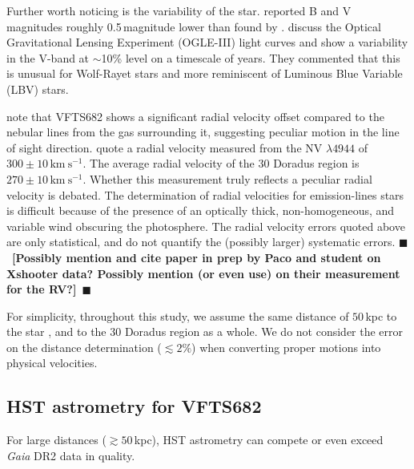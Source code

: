 \documentclass[apjl,twocolumn]{emulateapj}
\newcommand{\todo}[1]{{\large $\blacksquare$~\textbf{\color{red}[#1]}}~$\blacksquare$}
\newcommand{\kms}{{\,\mathrm{km\ s^{-1}}}}
\begin{document}
Further worth noticing is the variability of the
star. \citet{parker:93} reported B and V magnitudes roughly 0.5\,magnitude
lower than found by \citet{evans:11}.
\citet{bestenlehner:11} discuss the Optical Gravitational Lensing
Experiment (OGLE-III) light curves \citep{udalski:08} and show a
variability in the V-band at $\sim$10\% level on a timescale of years.
They commented that this is unusual for Wolf-Rayet stars and more reminiscent
of Luminous Blue Variable (LBV) stars. %

\cite{bressert:12} note that VFTS682 shows a significant radial
velocity offset compared to the nebular lines from the gas surrounding
it, suggesting peculiar motion in the line of sight direction.
\citet{bestenlehner:11} quote a radial velocity measured from the
N{\footnotesize V} $\lambda4944$ of   $300\pm10\kms$. The average radial velocity of the 30 Doradus region is 
$270\pm10\kms$. Whether this measurement truly reflects a peculiar radial velocity is debated. The determination of radial velocities for emission-lines stars is difficult because of the presence of an optically thick, non-homogeneous, and variable wind obscuring the photosphere. The radial velocity errors quoted above are only statistical, and do not quantify the (possibly larger)
systematic errors.  \todo{Possibly mention and cite paper in prep by Paco and student on Xshooter data?  Possibly mention (or even use) on their measurement for the RV?}


For simplicity, throughout this study, we assume the same
distance of $50$\,kpc to the star \citep[][]{pietrzynski:13}, and to
the 30 Doradus region as a whole. We do not consider the error on
the distance determination ($\lesssim2\%$) when converting proper motions into
physical velocities.

\subsection{HST astrometry for VFTS682}


For large distances ($\gtrsim50$\,kpc), HST astrometry can compete or even exceed \emph{Gaia} DR2 data in quality.
\end{document}
